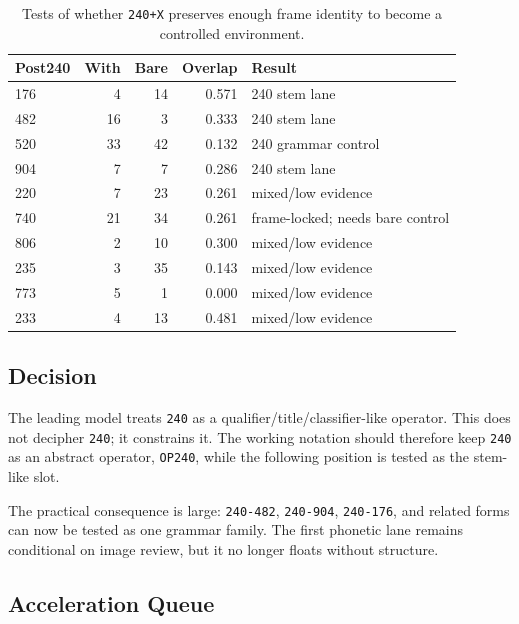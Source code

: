 \begin{table}[htbp]
\centering
\scriptsize
\begin{tabular}{lrrrp{}}
\toprule
\textbf{Post240} & \textbf{With} & \textbf{Bare} & \textbf{Overlap} & \textbf{Result} \\
\midrule
176 & 4 & 14 & 0.571 & 240 stem lane \\
482 & 16 & 3 & 0.333 & 240 stem lane \\
520 & 33 & 42 & 0.132 & 240 grammar control \\
904 & 7 & 7 & 0.286 & 240 stem lane \\
220 & 7 & 23 & 0.261 & mixed/low evidence \\
740 & 21 & 34 & 0.261 & frame-locked; needs bare control \\
806 & 2 & 10 & 0.300 & mixed/low evidence \\
235 & 3 & 35 & 0.143 & mixed/low evidence \\
773 & 5 & 1 & 0.000 & mixed/low evidence \\
233 & 4 & 13 & 0.481 & mixed/low evidence \\
\bottomrule
\end{tabular}
\caption{Tests of whether \texttt{240+X} preserves enough frame identity to become a controlled environment.}
\label{tab:grammar-keystone-240-preservation}
\end{table}

\subsection{Decision}

The leading model treats \texttt{240} as a qualifier/title/classifier-like operator. This does not decipher \texttt{240}; it constrains it. The working notation should therefore keep \texttt{240} as an abstract operator, \texttt{OP240}, while the following position is tested as the stem-like slot.

The practical consequence is large: \texttt{240-482}, \texttt{240-904}, \texttt{240-176}, and related forms can now be tested as one grammar family. The first phonetic lane remains conditional on image review, but it no longer floats without structure.

\subsection{Acceleration Queue}

